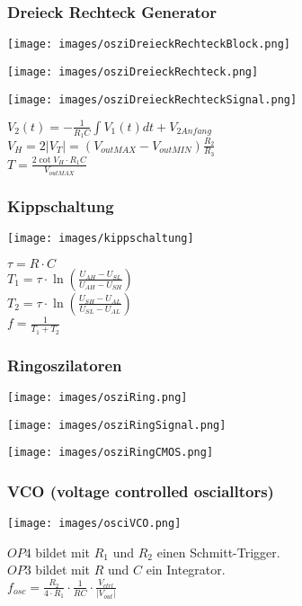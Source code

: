 \subsubsection{Dreieck Rechteck Generator}
	\begin{multicols}{3}
		\begin{center}
			\texttt{[image: images/osziDreieckRechteckBlock.png]}\\
		\end{center}
		\texttt{[image: images/osziDreieckRechteck.png]}
		\columnbreak
		
		\texttt{[image: images/osziDreieckRechteckSignal.png]}
		\columnbreak
			
		$V_2\left(t\right)=-\frac{1}{R_1C}\int V_1\left(t\right)dt+V_{2 Anfang}$\\
		$V_H=2\left|V_T\right|=\left(V_{outMAX}-V_{outMIN}\right)\frac{R_2}{R_3}$\\
		$T=\frac{2\cot V_H \cdot R_1C}{V_{outMAX}}$\\
	\end{multicols}
\subsubsection{Kippschaltung}
	\begin{minipage}{9cm}
		\texttt{[image: images/kippschaltung]}
	\end{minipage}
	\begin{minipage}{6cm}
		$\tau = R \cdot C $\\
		$T_1 = \tau \cdot \ln \left(\frac{U_{AH}-U_{SL}}{U_{AH}-U_{SH}} \right)$ \\
		$T_2 = \tau \cdot \ln \left(\frac{U_{SH}-U_{AL}}{U_{SL}-U_{AL}} \right)$ \\
		$f = \frac{1}{T_1 + T_2}$
	\end{minipage}
\subsubsection{Ringoszilatoren}
	\begin{multicols}{3}
	 	\texttt{[image: images/osziRing.png]}	
		\columnbreak
		
		\texttt{[image: images/osziRingSignal.png]}	
		\columnbreak
		
		\texttt{[image: images/osziRingCMOS.png]}
	\end{multicols}
\subsubsection{VCO (voltage controlled oscialltors)}
	\begin{multicols}{2}
		\texttt{[image: images/osciVCO.png]}
		\columnbreak
		
		$OP4$ bildet mit $R_1$ und $R_2$ einen Schmitt-Trigger.\\
		$OP3$ bildet mit $R$ und $C$ ein Integrator.\\
		$f_{osc}=\frac{R_2}{4\cdot R_1}\cdot \frac{1}{RC}\cdot
		\frac{V_{ctrl}}{\left|V_{out}\right|}$\\
	\end{multicols}
	
